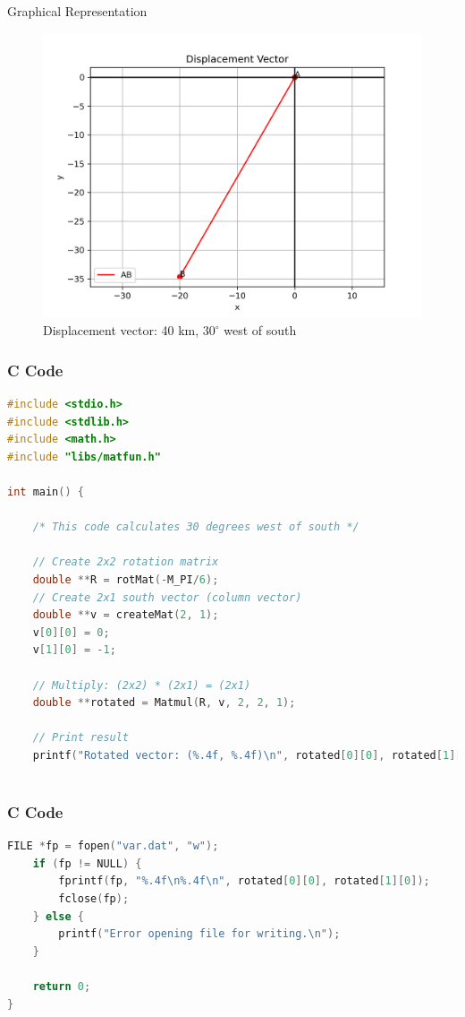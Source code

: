 \documentclass{beamer}
\begin{document}
\begin{frame}{Graphical Representation}
\begin{figure}[h!]
    \centering
    \includegraphics[width=0.65\linewidth]{figs/fig.png}
    \caption{Displacement vector: 40 km, \(30^\circ\) west of south}
\end{figure}
\end{frame}

\begin{frame}[fragile]
    \frametitle{C Code}
    \begin{lstlisting}[language=C]
#include <stdio.h>
#include <stdlib.h>
#include <math.h>
#include "libs/matfun.h"

int main() {

    /* This code calculates 30 degrees west of south */
    
    // Create 2x2 rotation matrix
    double **R = rotMat(-M_PI/6);
    // Create 2x1 south vector (column vector)
    double **v = createMat(2, 1);
    v[0][0] = 0;
    v[1][0] = -1;

    // Multiply: (2x2) * (2x1) = (2x1)
    double **rotated = Matmul(R, v, 2, 2, 1);

    // Print result
    printf("Rotated vector: (%.4f, %.4f)\n", rotated[0][0], rotated[1][0]);
    
    \end{lstlisting}
\end{frame}

\begin{frame}[fragile]
    \frametitle{C Code}
    \begin{lstlisting}[language=C]
    FILE *fp = fopen("var.dat", "w");
    if (fp != NULL) {
        fprintf(fp, "%.4f\n%.4f\n", rotated[0][0], rotated[1][0]);
        fclose(fp);
    } else {
        printf("Error opening file for writing.\n");
    }
    
    return 0;
}

    \end{lstlisting}
\end{frame}
\end{document}
